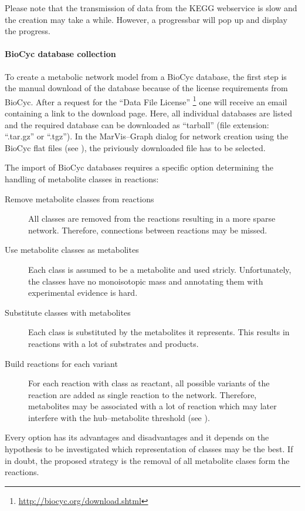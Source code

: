 \documentclass[titlepage,a4paper,twoside,9pt]{article}
\newcommand{\mg}{Mar\-Vis--Graph\xspace}
\newcommand{\pref}[1]{\prettyref{#1}}
\begin{document}
Please note that the transmission of data from the KEGG webservice is slow and
the creation may take a while. However, a progressbar will
pop up and display the progress.

\paragraph{BioCyc database collection} \cite{caspi2008metacyc,
caspi2010metacyc,caspi2012metacyc} To create a metabolic network model from
a BioCyc database, the first step is the manual download of the database
because of the license requirements from BioCyc.
After a request for the ``Data File License''
\footnote{\url{http://biocyc.org/download.shtml}} one will receive an email
containing a link to the download page. Here, all individual databases are
listed and the required database can be downloaded as ``tarball'' (file
extension: ``.tar.gz'' or ``.tgz'').
In the \mg dialog for network creation using the BioCyc flat files (see
\pref{fig:newnetwork_biocyc}), the priviously downloaded file has to be selected. 

The import of BioCyc databases requires a specific option determining the
handling of metabolite classes in reactions:
\begin{description}
	\item[Remove metabolite classes from reactions]
		All classes are removed from the reactions resulting in a more sparse
		network. Therefore, connections between reactions may be missed.
	\item[Use metabolite classes as metabolites]
		Each class is assumed to be a metabolite and used stricly. Unfortunately, the classes have no
		monoisotopic mass and annotating them with experimental evidence is hard.
	\item[Substitute classes with metabolites]
		Each class is substituted by the metabolites it represents. This
		results in reactions with a lot of substrates and products.
	\item[Build reactions for each variant]
		For each reaction with class as reactant, all possible variants of the
		reaction are added as single reaction to the network.
		Therefore, metabolites may be associated with a lot of reaction which
		may later interfere with the hub--metabolite threshold (see
		\pref{ssec:calculate}).
\end{description}
Every option has its advantages and disadvantages and it depends on the
hypothesis to be investigated which representation of classes may be the best.
If in doubt, the proposed strategy is the removal of all metabolite clases
form the reactions.
\end{document}

